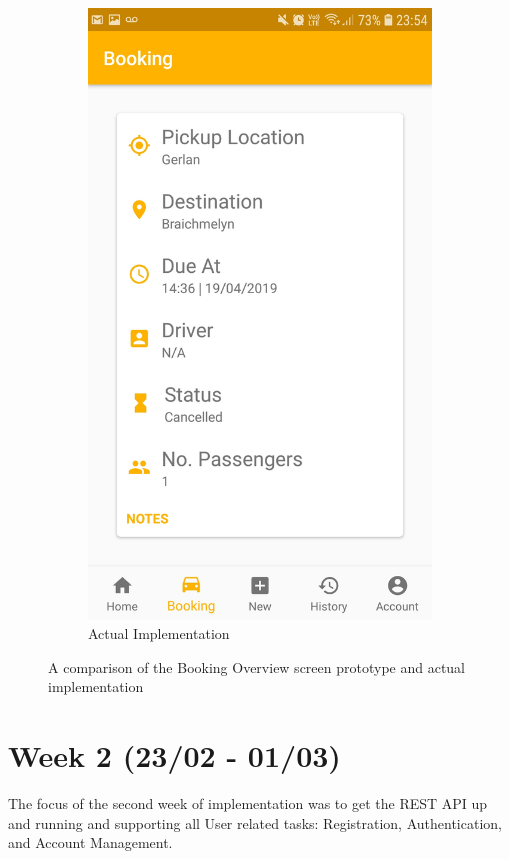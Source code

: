 \begin{figure}[!htb]
\begin{subfigure}[b]{0.4\linewidth}
		\includegraphics[width=\linewidth]{Resources/img/booking_overview_real.jpg}
		\caption{Actual Implementation}
	\end{subfigure}
	\caption{A comparison of the Booking Overview screen prototype and actual implementation}
	\label{fig:ui_compare}
\end{figure}

\newpage

\section{Week 2 (23/02 - 01/03)}
The focus of the second week of implementation was to get the REST API up and running and supporting all User related tasks: Registration, Authentication, and Account Management.

